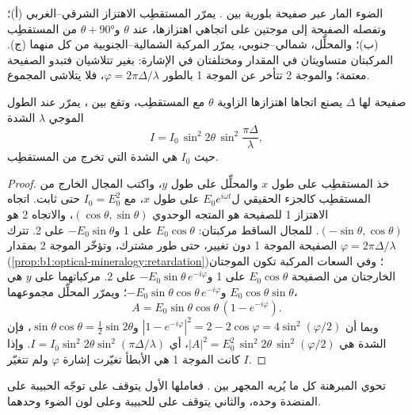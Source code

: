 \begin{omfigure}
{\small الضوء المار عبر صفيحة بلورية بين . يمرّر المستقطِب الاهتزاز الشرقي–الغربي (أ)؛ وتفصله الصفيحة إلى موجتين على اتجاهي اهتزازها، عند $\theta$ و$\theta + \ang{90}$ من المستقطِب (ب)؛ والمحلِّل، شمالي–جنوبي، يمرّر المركبة الشمالية–الجنوبية من كل منهما (ج). المركبتان متساويتان في المقدار ومختلفتان في الإشارة: بغير  تتلاشيان فتبدو الصفيحة معتمة؛ والموجة 2 تتأخر عن الموجة 1 بالطور $\varphi = 2\pi\Delta/\lambda$، فلا يتلاشى المجموع.}
\end{omfigure}

\begin{theorem}\label{thm:b1:optical-mineralogy:intensity}
صفيحة لها  $\Delta$ يصنع اتجاها اهتزازها الزاوية $\theta$ مع المستقطِب، وتقع بين ، يمرّر عند الطول الموجي $\lambda$ الشدة
\[
  I = I_0\,\sin^2 2\theta\,\sin^2\frac{\pi\Delta}{\lambda},
\]
حيث $I_0$ هي الشدة التي تخرج من المستقطِب.
\end{theorem}

\begin{proof}
خذ المستقطِب على طول $x$ والمحلِّل على طول $y$، واكتب المجال الخارج من المستقطِب كالجزء الحقيقي ل$E_0 e^{i\omega t}$ على طول $x$، مع $I_0 = E_0^2$ حتى ثابت. اتجاه الاهتزاز 1 للصفيحة هو المتجه الوحدوي $(\cos\theta, \sin\theta)$، والاتجاه 2 هو $(-\sin\theta, \cos\theta)$.
للمجال الساقط مركبتان: $E_0\cos\theta$ على 1 و$-E_0\sin\theta$ على 2. تترك الصفيحة الموجة 1 دون تغيير، حتى طور مشترك، وتؤخّر الموجة 2 بمقدار $\varphi = 2\pi\Delta/\lambda$ (\cref{prop:b1:optical-mineralogy:retardation})؛ وفي السعات المركبة تكون الموجتان الخارجتان من الصفيحة $E_0\cos\theta$ على 1 و$-E_0\sin\theta\,e^{-i\varphi}$ على 2. مركباتهما على $y$ هي $E_0\cos\theta\sin\theta$ و$-E_0\sin\theta\cos\theta\,e^{-i\varphi}$؛ ويمرّر المحلِّل مجموعهما،
\[
  A = E_0\sin\theta\cos\theta\,(1 - e^{-i\varphi}) .
\]
وبما أن $|1 - e^{-i\varphi}|^2 = 2 - 2\cos\varphi = 4\sin^2(\varphi/2)$ و$\sin\theta\cos\theta = \frac12\sin2\theta$، فإن الشدة هي $|A|^2 = E_0^2\,\sin^2 2\theta\,\sin^2(\varphi/2)$، أي $I = I_0\sin^2 2\theta\sin^2(\pi\Delta/\lambda)$. وإذا كانت الموجة 1 هي الأبطأ تغيّرت إشارة $\varphi$ ولم تتغيّر $I$.
\end{proof}

تحوي المبرهنة كل ما يُريه المجهر بين . فعاملها الأول يتوقف على توجّه الحبيبة على المنضدة وحده، والثاني يتوقف على  للحبيبة وعلى لون الضوء وحدهما.

